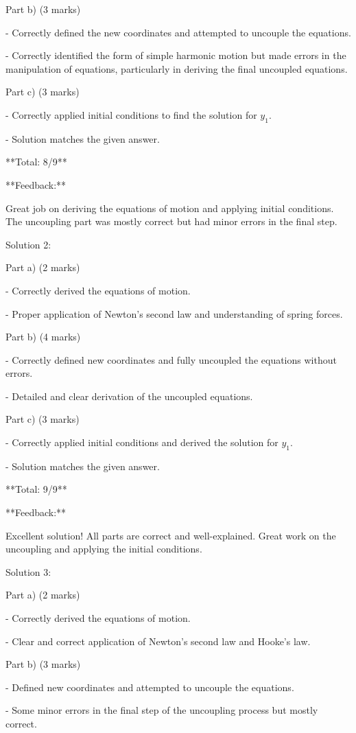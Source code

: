 \documentclass[a4paper,11pt]{article}
\begin{document}
Part b) (3 marks)

- Correctly defined the new coordinates and attempted to uncouple the equations.

- Correctly identified the form of simple harmonic motion but made errors in the manipulation of equations, particularly in deriving the final uncoupled equations.

Part c) (3 marks)

- Correctly applied initial conditions to find the solution for \( y_1 \).

- Solution matches the given answer.

**Total: 8/9**

**Feedback:**

Great job on deriving the equations of motion and applying initial conditions. The uncoupling part was mostly correct but had minor errors in the final step.

Solution 2:

Part a) (2 marks)

- Correctly derived the equations of motion.

- Proper application of Newton's second law and understanding of spring forces.

Part b) (4 marks)

- Correctly defined new coordinates and fully uncoupled the equations without errors.

- Detailed and clear derivation of the uncoupled equations.

Part c) (3 marks)

- Correctly applied initial conditions and derived the solution for \( y_1 \).

- Solution matches the given answer.

**Total: 9/9**

**Feedback:**

Excellent solution! All parts are correct and well-explained. Great work on the uncoupling and applying the initial conditions.

Solution 3:

Part a) (2 marks)

- Correctly derived the equations of motion.

- Clear and correct application of Newton's second law and Hooke's law.

Part b) (3 marks)

- Defined new coordinates and attempted to uncouple the equations.

- Some minor errors in the final step of the uncoupling process but mostly correct.
\end{document}
